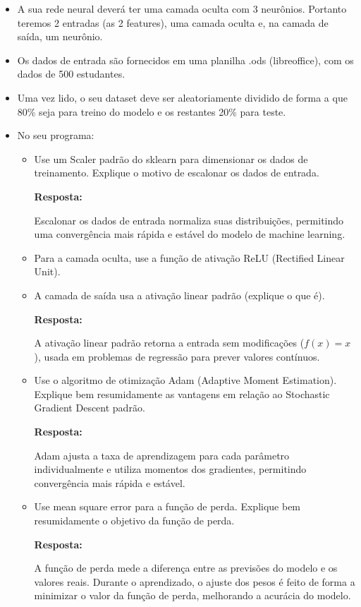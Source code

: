 \documentclass[12 pt]{article}
\begin{document}
\begin{itemize}
    \item A sua rede neural deverá ter uma camada oculta com 3 neurônios. Portanto teremos 2 entradas (as 2 features), uma camada oculta e, na camada de saída, um neurônio.
    \item Os dados de entrada são fornecidos em uma planilha .ods (libreoffice), com os dados de 500 estudantes.
    \item Uma vez lido, o seu dataset deve ser aleatoriamente dividido de forma a que 80\% seja para treino do modelo e os restantes 20\% para teste.
    \item No seu programa:
    \begin{itemize}
        \item Use um Scaler padrão do sklearn para dimensionar os dados de treinamento. Explique o motivo de escalonar os dados de entrada.
        
        \textbf{Resposta:} \par

        Escalonar os dados de entrada normaliza suas distribuições, permitindo uma convergência mais rápida e estável do modelo de machine learning.

        \item Para a camada oculta, use a função de ativação ReLU (Rectified Linear Unit).
        \item A camada de saída usa a ativação linear padrão (explique o que é).
        
        \textbf{Resposta:} \par

        A ativação linear padrão retorna a entrada sem modificações ($f(x)=x$), usada em problemas de regressão para prever valores contínuos.

        \item Use o algoritmo de otimização Adam (Adaptive Moment Estimation). Explique bem resumidamente as vantagens em relação ao Stochastic Gradient Descent padrão.
        
        \textbf{Resposta:} \par

        Adam ajusta a taxa de aprendizagem para cada parâmetro individualmente e utiliza momentos dos gradientes, permitindo convergência mais rápida e estável.

        \item Use mean square error para a função de perda. Explique bem resumidamente o objetivo da função de perda.
          
        \textbf{Resposta:} \par

        A função de perda mede a diferença entre as previsões do modelo e os valores reais. Durante o aprendizado, o ajuste dos pesos é feito de forma a minimizar o valor da função de perda, melhorando a acurácia do modelo.

    \end{itemize}
\end{itemize}
\end{document}
